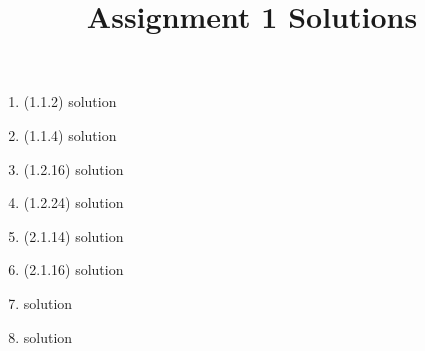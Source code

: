 \documentclass[12pt, letterpaper]{../homework}
\title{Assignment 1 Solutions}
\newcommand{\booksolution}[4]{\item (#1.#2.#3) {solution}}
\newcommand{\extrahwsolution}[1]{\item {solution}}
\begin{document}
  \maketitle
  
  \begin{enumerate}
    
    \booksolution{1}{1}{2}{../../book-problems/1/1/2}
    \booksolution{1}{1}{4}{../../book-problems/1/1/4}
    \booksolution{1}{2}{16}{../../book-problems/1/2/16}
    \booksolution{1}{2}{24}{../../book-problems/1/2/24}
    \booksolution{2}{1}{14}{../../book-problems/2/1/14}
    \booksolution{2}{1}{16}{../../book-problems/2/1/16}
    \extrahwsolution{../../extra-hw-problems/silly/poll}
    \extrahwsolution{../../extra-hw-problems/silly/potato}
  \end{enumerate}
\end{document}
